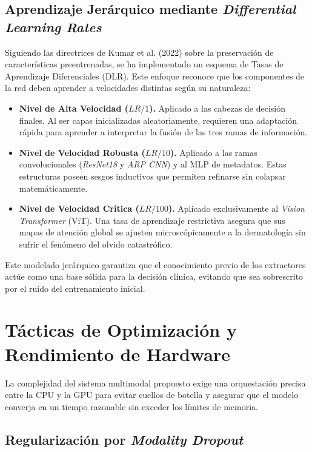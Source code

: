 \subsection{Aprendizaje Jerárquico mediante \textit{Differential Learning Rates}}

Siguiendo las directrices de Kumar et al. (2022) sobre la preservación de características preentrenadas, se ha implementado un esquema de Tasas de Aprendizaje Diferenciales (DLR). Este enfoque reconoce que los componentes de la red deben aprender a velocidades distintas según su naturaleza:

\begin{itemize}
	\item \textbf{Nivel de Alta Velocidad ($LR/1$).} Aplicado a las cabezas de decisión finales. Al ser capas inicializadas aleatoriamente, requieren una adaptación rápida para aprender a interpretar la fusión de las tres ramas de información.
	
	\item \textbf{Nivel de Velocidad Robusta ($LR/10$).} Aplicado a las ramas convolucionales (\textit{ResNet18} y \textit{ARP CNN}) y al MLP de metadatos. Estas estructuras poseen sesgos inductivos que permiten refinarse sin colapsar matemáticamente.
	
	\item \textbf{Nivel de Velocidad Crítica ($LR/100$).} Aplicado exclusivamente al \textit{Vision Transformer} (ViT). Una tasa de aprendizaje restrictiva asegura que sus mapas de atención global se ajusten microscópicamente a la dermatología sin sufrir el fenómeno del olvido catastrófico.
\end{itemize}

Este modelado jerárquico garantiza que el conocimiento previo de los extractores actúe como una base sólida para la decisión clínica, evitando que sea sobrescrito por el ruido del entrenamiento inicial.

\section{Tácticas de Optimización y Rendimiento de Hardware}

La complejidad del sistema multimodal propuesto exige una orquestación precisa entre la CPU y la GPU para evitar cuellos de botella y asegurar que el modelo converja en un tiempo razonable sin exceder los límites de memoria.

\subsection{Regularización por \textit{Modality Dropout}}

